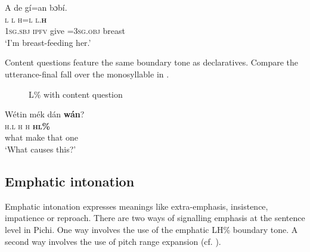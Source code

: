 \ea%
    \label{ex:key:81}
    \glll   \MakeUppercase{A}   de    gí=an    bɔbí.\\
\textsc{l}    \textsc{l}    \textsc{h=l}      \textsc{l.}\textbf{\textsc{h}}\\
\textsc{1sg.sbj}  \textsc{ipfv}    give  =\textsc{3sg.obj}  breast\\
\glt ‘I’m breast-feeding her.’  
\z

Content questions feature the same boundary tone as declaratives. Compare the utterance-final fall over the monosyllable in .

\begin{figure}
\caption{L\% with content question}
\label{fig:key:3.29}
\end{figure}


\ea%
    \label{ex:key:82}
    \glll   Wétin  mék    dán    \textbf{wán}?  \\
\textsc{h.l}    \textsc{h}    \textsc{h}    \textbf{\textsc{hl\%}}      \\
what  make  that    one\\
\glt ‘What causes this?’
\z

\subsection{Emphatic intonation}\label{sec:3.4.2}

Emphatic intonation expresses meanings like extra-emphasis, insistence, impatience or reproach. There are two ways of signalling emphasis at the sentence level in Pichi. One way involves the use of the emphatic LH\% boundary tone. A second way involves the use of pitch range expansion (cf. ).


